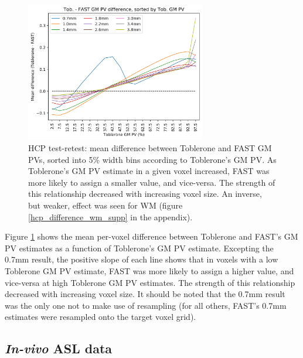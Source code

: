 \documentclass[12pt]{report}
\begin{document}
\begin{figure}[H]
\centering
\includegraphics[width = 0.7\textwidth]{hcp_difference.png}
\caption{HCP test-retest: mean difference between Toblerone and FAST GM PVs, sorted into 5\% width bins according to Toblerone’s GM PV. As Toblerone’s GM PV estimate in a given voxel increased, FAST was more likely to assign a smaller value, and vice-versa. The strength of this relationship decreased with increasing voxel size. An inverse, but weaker, effect was seen for WM (figure \ref{hcp_difference_wm_supp} in the appendix).}
\label{hcp_difference}
\end{figure}

Figure \ref{hcp_difference} shows the mean per-voxel difference between Toblerone and FAST’s GM PV estimates as a function of Toblerone’s GM PV estimate. Excepting the 0.7mm result, the positive slope of each line shows that in voxels with a low Toblerone GM PV estimate, FAST was more likely to assign a higher value, and vice-versa at high Toblerone GM PV estimates. The strength of this relationship decreased with increasing voxel size. It should be noted that the 0.7mm result was the only one not to make use of resampling (for all others, FAST’s 0.7mm estimates were resampled onto the target voxel grid).

\subsection{\textit{In-vivo} ASL data}
\end{document}
